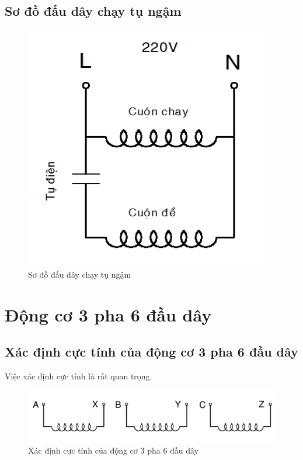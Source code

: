 \documentclass[13pt,a4paper]{extarticle}
\begin{document}
\subsection{Sơ đồ đấu dây chạy tụ ngậm}
\begin{figure}[!h]
\begin{center}
\includegraphics[scale=.5]{chay-ngam-2}
\end{center}
\caption{Sơ đồ đấu dây chạy tụ ngậm}\label{Fig:chay-ngam-1}
\end{figure}
\section{Động cơ 3 pha 6 đầu dây}
\subsection{Xác định cực tính của động cơ 3 pha 6 đầu dây}
Việc xác định cực tính là rất quan trọng.
\begin{figure}[!h]
\begin{center}
\includegraphics[scale=.6]{3p-6day}
\end{center}
\caption{Xác định cực tính của động cơ 3 pha 6 đầu dây}
\end{figure}
\end{document}
